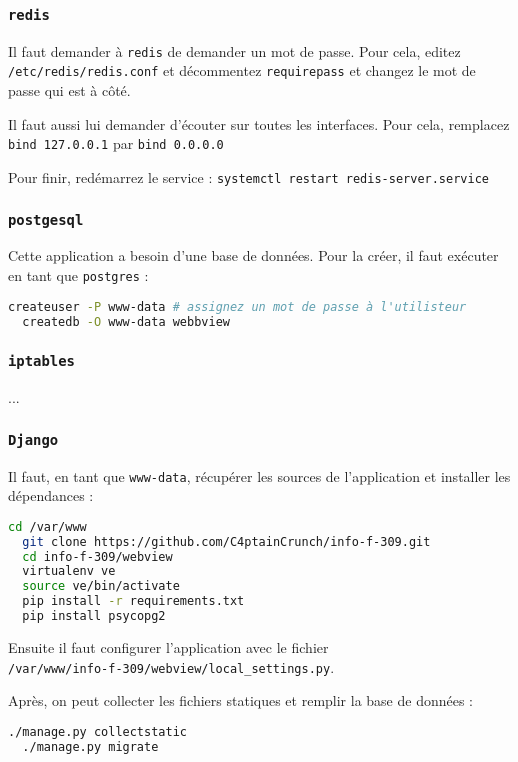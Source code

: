 \documentclass[10pt,a4paper]{article}
\begin{document}
\subsubsection{\texttt{redis}}

Il faut demander à \texttt{redis} de demander un mot de passe.
Pour cela, editez \texttt{/etc/redis/redis.conf} et décommentez \texttt{requirepass}
et changez le mot de passe qui est à côté.

Il faut aussi lui demander d'écouter sur toutes les interfaces.
Pour cela, remplacez \texttt{bind 127.0.0.1} par \texttt{bind 0.0.0.0}

Pour finir, redémarrez le service : \texttt{systemctl restart redis-server.service}


\subsubsection{\texttt{postgesql}}

Cette application a besoin d'une base de données. Pour la créer, il faut exécuter en tant que \texttt{postgres} :
\begin{lstlisting}[language=bash]
  createuser -P www-data # assignez un mot de passe à l'utilisteur
  createdb -O www-data webbview
\end{lstlisting}

\subsubsection{\texttt{iptables}}

...

\subsubsection{\texttt{Django}}

Il faut, en tant que \texttt{www-data}, récupérer les sources de l'application et installer les dépendances :
\begin{lstlisting}[language=bash]
  cd /var/www
  git clone https://github.com/C4ptainCrunch/info-f-309.git
  cd info-f-309/webview
  virtualenv ve
  source ve/bin/activate
  pip install -r requirements.txt
  pip install psycopg2
\end{lstlisting}

Ensuite il faut configurer l'application avec le fichier\\\texttt{/var/www/info-f-309/webview/local\_settings.py}.

Après, on peut collecter les fichiers statiques et remplir la base de données :
\begin{lstlisting}[language=bash]
  ./manage.py collectstatic
  ./manage.py migrate
\end{lstlisting}
\end{document}
